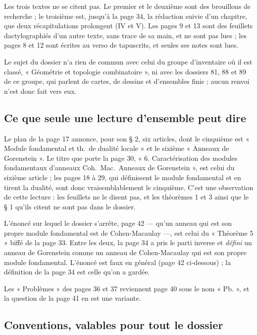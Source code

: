 \documentclass[11pt,a4paper]{article}
\begin{document}
Les trois textes ne se citent pas. Le premier et le deuxième sont des
brouillons de recherche ; le troisième est, jusqu'à la page 34, la rédaction
suivie d'un chapitre, que deux récapitulations prolongent (IV et V). Les pages 9 et 13 sont des feuillets
dactylographiés d'un autre texte, sans trace de sa main, et ne sont pas lues ;
les pages 8 et 12 sont écrites au verso de tapuscrits, et seules ses notes
sont lues.

Le sujet du dossier n'a rien de commun avec celui du groupe d'inventaire où il
est classé, « Géométrie et topologie combinatoire », ni avec les dossiers 81,
88 et 89 de ce groupe, qui parlent de cartes, de dessins et d'ensembles
finis ; aucun renvoi n'est donc fait vers eux.

\subsection*{Ce que seule une lecture d'ensemble peut dire}

Le plan de la page 17 annonce, pour son § 2, six articles, dont le cinquième
est « Module fondamental et th.\ de dualité locale » et le sixième « Anneaux de
Gorenstein ». Le titre que porte la page 30, « 6. Caractérisation des modules
fondamentaux d'anneaux Coh.\ Mac.\ Anneaux de Gorenstein », est celui du
sixième article ; les pages 18 à 29, qui définissent le module fondamental et
en tirent la dualité, sont donc vraisemblablement le cinquième. C'est une
observation de cette lecture : les feuillets ne le disent pas, et les
théorèmes 1 et 3 ainsi que le § 1 qu'ils citent ne sont pas dans le dossier.

L'énoncé sur lequel le dossier s'arrête, page 42 --- qu'un anneau qui est son
propre module fondamental est de Cohen-Macaulay ---, est celui du « Théorème
5 » biffé de la page 33. Entre les deux, la page 34 a pris le parti inverse et
\emph{défini} un anneau de Gorenstein comme un anneau de Cohen-Macaulay qui est
son propre module fondamental. L'énoncé est faux en général
(page 42 ci-dessous) ; la définition de la page 34 est celle qu'on a gardée.

Les « Problèmes » des pages 36 et 37 reviennent page 40 sous le nom « Pb. »,
et la question de la page 41 en est une variante.

\subsection*{Conventions, valables pour tout le dossier}
\end{document}
